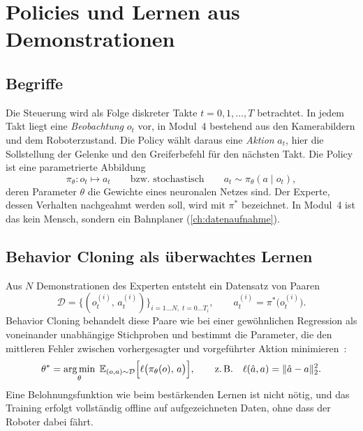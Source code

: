 \section{Policies und Lernen aus Demonstrationen}
\label{sec:bc-mathe}

\subsection{Begriffe}

Die Steuerung wird als Folge diskreter Takte $t = 0, 1, \dots, T$ betrachtet. In jedem Takt
liegt eine \emph{Beobachtung} $o_t$ vor, in Modul~4 bestehend aus den Kamerabildern und dem
Roboterzustand. Die Policy wählt daraus eine \emph{Aktion} $a_t$, hier die Sollstellung der
Gelenke und den Greiferbefehl für den nächsten Takt. Die Policy ist eine parametrierte
Abbildung
\begin{equation}
  \pi_\theta : o_t \mapsto a_t
  \qquad\text{bzw. stochastisch}\qquad
  a_t \sim \pi_\theta(a \mid o_t),
  \label{eq:policy}
\end{equation}
deren Parameter $\theta$ die Gewichte eines neuronalen Netzes sind. Der Experte, dessen
Verhalten nachgeahmt werden soll, wird mit $\pi^{*}$ bezeichnet. In Modul~4 ist das kein
Mensch, sondern ein Bahnplaner (\cref{ch:datenaufnahme}).

\subsection{Behavior Cloning als überwachtes Lernen}

Aus $N$ Demonstrationen des Experten entsteht ein Datensatz von Paaren
\begin{equation}
  \mathcal{D} = \bigl\{ (o_t^{(i)},\, a_t^{(i)}) \bigr\}_{i = 1 \dots N,\; t = 0 \dots T_i},
  \qquad a_t^{(i)} = \pi^{*}\bigl(o_t^{(i)}\bigr).
\end{equation}
Behavior Cloning behandelt diese Paare wie bei einer gewöhnlichen Regression als voneinander
unabhängige Stichproben und bestimmt die Parameter, die den mittleren Fehler zwischen
vorhergesagter und vorgeführter Aktion minimieren~\cite{pomerleau1989,argall2009,osa2018}:
\begin{equation}
  \theta^{*} = \operatorname*{arg\,min}_{\theta}\;
  \mathbb{E}_{(o, a) \sim \mathcal{D}} \Bigl[ \ell\bigl(\pi_\theta(o),\, a\bigr) \Bigr],
  \qquad \text{z.\,B.}\quad \ell(\hat a, a) = \lVert \hat a - a \rVert_2^2 .
  \label{eq:bc-ziel}
\end{equation}
Eine Belohnungsfunktion wie beim bestärkenden Lernen ist nicht nötig, und das Training
erfolgt vollständig offline auf aufgezeichneten Daten, ohne dass der Roboter dabei fährt.

